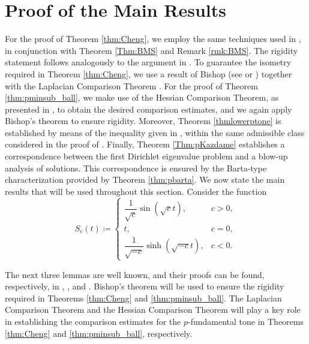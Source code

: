 \documentclass{article}
\begin{document}
\section{Proof of the Main Results}\label{Sec3} For the proof of Theorem \ref{thm:Cheng}, we employ the same techniques used in \cite{BessaMontenegro}, in conjunction with Theorem \ref{Thm:BMS} and Remark \ref{rmk:BMS}. The rigidity statement follows analogously to the argument in \cite[Theorem 1.8]{BessaMontenegro}. To guarantee the isometry required in Theorem \ref{thm:Cheng}, we use a result of Bishop (see \cite[Theorem 3.1]{BessaMontenegro} or \cite{BishopCrittenden1964}) together with the Laplacian Comparison Theorem \cite{GreeneWu1979}. For the proof of Theorem \ref{thm:pminsub_ball}, we make use of the Hessian Comparison Theorem, as presented in \cite{SchoenYau1994}, to obtain the desired comparison estimates, and we again apply Bishop’s theorem to ensure rigidity. Moreover, Theorem \ref{thmlowerptone} is established by means of the inequality given in \cite[Theorem 1.1]{LimaMontenegroSantos2010}, within the same admissible class considered in the proof of \cite[Theorem 1.6]{Bessa-Silvana}. Finally, Theorem \ref{Thm:pKazdame} establishes a correspondence between the first Dirichlet eigenvalue problem and a blow-up analysis of solutions. This correspondence is ensured by the Barta-type characterization provided by Theorem \ref{thm:pbarta}. We now state the main results that will be used throughout this section. Consider the function
\begin{equation}\label{espaceformfunc}
S_c(t) \coloneq
\begin{cases}
\dfrac{1}{\sqrt{c}}\sin(\sqrt{c}t), & c>0,\\
t, & c=0,\\
\dfrac{1}{\sqrt{-c}}\sinh(\sqrt{-c}t), & c<0.
\end{cases}    
\end{equation}

The next three lemmas are well known, and their proofs can be found, respectively, in  \cite{BishopCrittenden1964}, \cite{GreeneWu1979}, and \cite{SchoenYau1994}. Bishop’s theorem will be used to ensure the rigidity required in Theorems \eqref{thm:Cheng} and \eqref{thm:pminsub_ball}. The Laplacian Comparison Theorem and the Hessian Comparison Theorem will play a key role in establishing the comparison estimates for the $p$-fundamental tone in Theorems \eqref{thm:Cheng} and \eqref{thm:pminsub_ball}, respectively.
\end{document}
